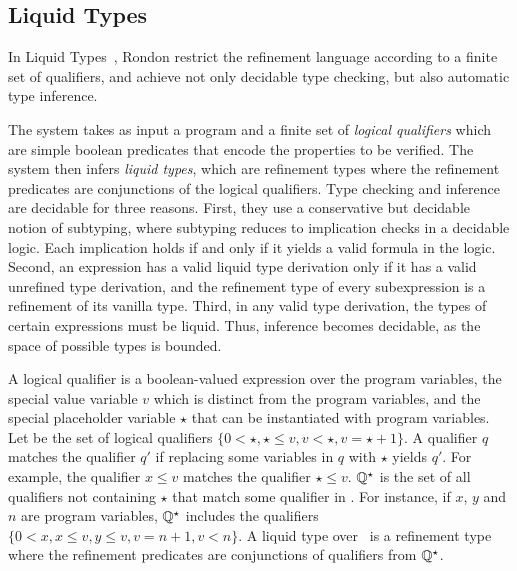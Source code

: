 %

\subsection{Liquid Types}\label{subsec:liquid}

In Liquid Types~\cite{LiquidPLDI08}, 
Rondon \etal restrict the refinement language according to a 
finite set of qualifiers, and achieve not only decidable type checking, but also automatic
type inference.

The system takes as input a program and 
a finite set of \textit{logical qualifiers}
which are simple boolean predicates 
that encode the properties to be verified. 
The system then infers
\textit{liquid types}, which are refinement types where the refinement predicates are conjunctions of the logical qualifiers.
Type checking and inference are decidable for
three reasons. 
%
First, they use a conservative but decidable
notion of subtyping, where 
subtyping reduces to implication checks in a decidable logic.
Each implication holds if and only if it yields a valid formula in
the logic. 
%
Second, an expression has a valid liquid type derivation
only if it has a valid unrefined type derivation, and the refinement 
type of every subexpression is a refinement of its vanilla type. 
%
Third, in any valid type derivation, the types of certain expressions
must be liquid. Thus, inference becomes decidable, as the space of
possible types is bounded. 


A logical qualifier is a
boolean-valued expression over the program variables, 
the special value variable $v$ which is distinct from the
program variables, and the special placeholder variable $\star$ that
can be instantiated with program variables. 
Let \qset be the set of logical qualifiers
$\{0 < \star, \star \leq v, v < \star,  v = \star + 1\}$. 
%
A qualifier $q$ matches the qualifier $q'$
if replacing some variables in $q$ with $\star$ yields $q'$.
For example, the qualifier
$x \leq v$ matches the qualifier $\star \leq v$. 
$\mathbb{Q}^\star$
is the set of all
qualifiers not containing $\star$ that match some qualifier in \qset. 
For instance, %
if $x$, $y$ and $n$ are program variables,
$\mathbb{Q}^\star$
includes the qualifiers
$\{0 < x, x \leq v, y \leq v, v = n + 1, v < n\}$. 
A liquid type over \qset\ is a refinement type where the refinement predicates are
conjunctions of qualifiers from $\mathbb{Q} ^ \star$.

